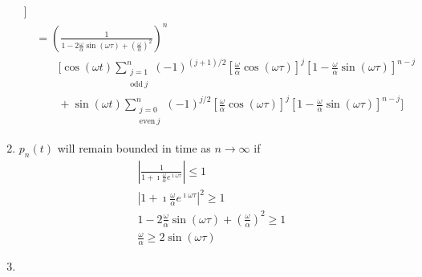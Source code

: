 \begin{Solution}
\begin{enumerate}
\begin{align*}
      \Big] \\
      &= \left(\frac{1}{1 - 2 \frac{\omega}{\alpha} \sin(\omega \tau)
          +(\frac{\omega}{\alpha})^2} \right)^n \\
      &\qquad \Big[ \cos(\omega t) 
      \sum_{\substack{j=1 \\ \mathrm{odd}\ j}}^n
      (-1)^{(j+1)/2} \left[\frac{\omega}{\alpha} \cos(\omega \tau)
      \right]^j \left[1-\frac{\omega}{\alpha}\sin(\omega\tau)
      \right]^{n-j} \\
      &\qquad + \sin(\omega t) 
      \sum_{\substack{j=0 \\ \mathrm{even}\ j}}^n
      (-1)^{j/2} \left[\frac{\omega}{\alpha} \cos(\omega \tau)
      \right]^j \left[1-\frac{\omega}{\alpha}\sin(\omega\tau)
      \right]^{n-j} \Big] 
    \end{align*}
  \item
    $p_n(t)$ will remain bounded in time as $n \to \infty$ if 
    \begin{gather*}
      \left| \frac{1}{1 + \imath \frac{\omega}{\alpha} e^{\imath \omega \tau}} \right| 
      \leq 1 \\
      \left| 1 + \imath \frac{\omega}{\alpha} e^{\imath \omega \tau} \right|^2 \geq 1 \\
      1 - 2 \frac{\omega}{\alpha} \sin(\omega \tau) + \left(\frac{\omega}{\alpha}
      \right)^2 \geq 1 \\
      \boxed{ \frac{\omega}{\alpha} \geq 2 \sin(\omega \tau) }
    \end{gather*}
  \item
  \end{enumerate}
\end{Solution}




\raggedbottom







